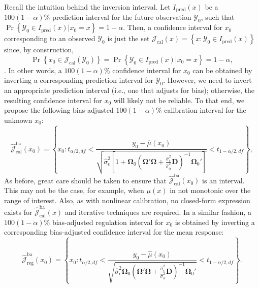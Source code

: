 \documentclass[cmfont,usenames,dvipsnames,leqno]{afit-etd}\usepackage[]{graphicx}\usepackage[]{color}
\newcommand{\mc}[1]{\ensuremath{\mathcal{#1}}}
\newcommand{\wh}[1]{\ensuremath{\widehat{#1}}}
\newcommand{\tquant}[2]{\ensuremath{t_{#1,#2}}}
\begin{document}
Recall the intuition behind the inversion interval. Let $I_\mathrm{pred}(x)$ be a $100(1 - \alpha)\%$ prediction interval for the future observation $\mc{Y}_0$, such that $\Pr\left\{ \mc{Y}_0 \in I_\mathrm{pred}(x) | x_0 = x \right\} = 1 - \alpha$. Then, a confidence interval for $x_0$ corresponding to an observed $\mc{Y}_0$ is just the set $\mc{J}_\mathrm{cal}(x) = \left\{x : \mc{Y}_0 \in I_\mathrm{pred}(x)\right\}$ since, by construction, 
\begin{equation*}
\Pr\left\{x_0 \in \mc{J}_\mathrm{cal}(\mc{Y}_0)\right\} = \Pr\left\{\mc{Y}_0 \in I_\mathrm{pred}(x) | x_0 = x\right\} = 1 - \alpha,
\end{equation*}
\citep{clark_calibration_1980}. In other words, a $100(1 - \alpha)\%$ confidence interval for $x_0$ can be obtained by inverting a corresponding prediction interval for $\mc{Y}_0$. However, we need to invert an appropriate prediction interval (i.e., one that adjusts for bias); otherwise, the resulting confidence interval for $x_0$ will likely not be reliable. To that end, we propose the following bias-adjusted $100(1-\alpha)\%$ calibration interval for the unknown $x_0$:
\begin{equation}
\label{eqn:bc-inversion-interval}
  \wh{\mc{J}}_\mathrm{cal}^{\mathrm{ba}}(x_0) = \left\{x_0: \tquant{\alpha/2}{df} < \frac{y_0 - \wh{\mu}(x_0)}{\sqrt{\wh{\sigma}_\epsilon^2\left[1 + \bm{\Omega}_0\left(\bm{\Omega}'\bm{\Omega} + \frac{\wh{\sigma}_\epsilon^2}{\wh{\sigma}_\alpha^2}\bm{D}\right)^{-1}\bm{\Omega}_0'\right]}} < \tquant{1-\alpha/2}{df}\right\},
\end{equation}
As before, great care should be taken to ensure that $\wh{\mc{J}}_\mathrm{cal}^{\mathrm{ba}}(x_0)$ is an interval. This may not be the case, for example, when $\mu(x)$ in not monotonic over the range of interest. Also, as with nonlinear calibration, no closed-form expression exists for $\wh{\mc{J}}_\mathrm{cal}^{\mathrm{ba}}(x)$ and iterative techniques are required. In a similar fashion, a $100(1-\alpha)\%$ bias-adjusted regulation interval for $x_0$ is obtained by inverting a corresponding bias-adjusted confidence interval for the mean response:
\begin{equation*}
  \wh{\mc{J}}_\mathrm{reg}^{\mathrm{ba}}(x_0) = \left\{x_0: \tquant{\alpha/2}{df} < \frac{y_0 - \wh{\mu}(x_0)}{\sqrt{\wh{\sigma}_\epsilon^2\bm{\Omega}_0\left(\bm{\Omega}'\bm{\Omega} + \frac{\wh{\sigma}_\epsilon^2}{\wh{\sigma}_\alpha^2}\bm{D}\right)^{-1}\bm{\Omega}_0'}} < \tquant{1-\alpha/2}{df}\right\}.
\end{equation*}
\end{document}
